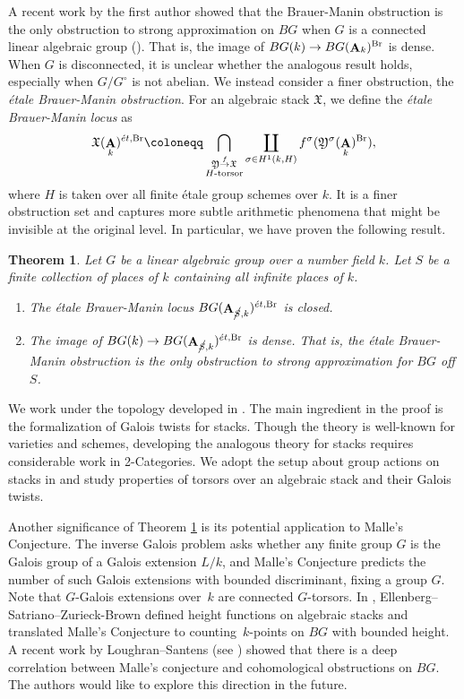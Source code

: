 \documentclass[12pt, final]{amsart}
\theoremstyle{remark}
\theoremstyle{definition}
\theoremstyle{plain}
\newtheorem{theorem}[example]{Theorem}
\newcommand{\fX}{{\mathfrak X}}
\newcommand{\fY}{{\mathfrak Y}}
\newcommand{\et}{{\acute{e}t}}
\DeclareMathOperator{\bA}{{\bf A}}
\newcommand{\cS}{\cancel{S}}
\DeclareMathOperator{\Br}{Br}
\begin{document}
A recent work by the first author showed that the Brauer-Manin obstruction is the only obstruction to strong approximation on $BG$ when $G$ is a connected linear algebraic group (\cite[Theorem 5.5]{Dhillon:25}). That is, the image of $BG(k) \to BG(\bA_k)^{\Br}$ is dense. When $G$ is disconnected, it is unclear whether the analogous result holds, especially when $G/G^{\circ}$ is not abelian. We instead consider a finer obstruction, the \emph{\'etale Brauer-Manin obstruction}. For an algebraic stack $\fX$, we define the \emph{\'etale Brauer-Manin locus} as 
\begin{equation*}
    \fX(\bA_k)^{\et, \Br}\coloneqq \bigcap_{\substack{\fY \overset{f}{\to} \fX \\ H \textnormal{-torsor}}} \coprod_{\sigma \in H^1(k,H)} f^{\sigma}(\fY^{\sigma}(\bA_{k})^{\Br}), 
\end{equation*} where $H$ is taken over all finite \'etale group schemes over $k$. It is a finer obstruction set and captures more subtle arithmetic phenomena that might be invisible at the original level.
In particular, we have proven the following result. 



\begin{theorem}\label{thm:intro} 
Let $G$ be a linear algebraic group over a number field $k$. Let $S$ be a finite collection of places of $k$ containing all infinite places of $k$.
    \begin{enumerate}
        \item The \'etale Brauer-Manin locus $BG(\bA_{\cS,k})^{\et,\Br}$ is closed.
        \item The image of $BG(k)\to BG(\bA_{\cS,k})^{\et,\Br}$ is dense. That is, the \'etale Brauer-Manin obstruction is the only obstruction to strong approximation for $BG$ off $S$.
    \end{enumerate}
\end{theorem}

We work under the topology developed in \cite{Dhillon:25}. The main ingredient in the proof is the formalization of Galois twists for stacks. Though the theory is well-known for varieties and schemes, developing the analogous theory for stacks requires considerable work in 2-Categories. We adopt the setup about group actions on stacks in \cite{ginot} and study properties of torsors over an algebraic stack and their Galois twists.


Another significance of Theorem \ref{thm:intro} is its potential application to Malle's Conjecture. The inverse Galois problem asks whether any finite group $G$ is the Galois group of a Galois extension $L/k$, and Malle's Conjecture predicts the number of such Galois extensions with bounded discriminant, fixing a group $G$. Note that $G$-Galois extensions over~$k$ are connected $G$-torsors. In \cite{Ellenberg--Satriano--Zureick-Brown2023}, Ellenberg--Satriano--Zurieck-Brown defined height functions on algebraic stacks and translated Malle's Conjecture to counting~$k$-points on $BG$ with bounded height. 
A recent work by Loughran--Santens (see \cite{loughran-santens25}) showed that there is a deep correlation between Malle's conjecture and cohomological obstructions on $BG$. The authors would like to explore this direction in the future.
\end{document}
